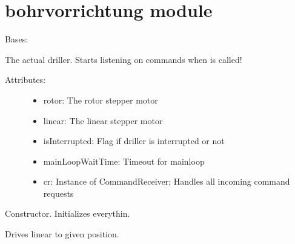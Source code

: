 \documentclass[letterpaper,10pt,english]{sphinxmanual}
\begin{document}
\section{bohrvorrichtung module}
\label{bohrvorrichtung::doc}\label{bohrvorrichtung:bohrvorrichtung-module}\label{bohrvorrichtung:module-bohrvorrichtung}

\begin{fulllineitems}
\label{bohrvorrichtung:bohrvorrichtung.Bohrvorrichtung}
Bases: 

The actual driller. Starts listening on commands when {\hyperref[bohrvorrichtung:bohrvorrichtung.Bohrvorrichtung.start]{}} is called!
\begin{description}
\item[{Attributes:}] \leavevmode\begin{itemize}
\item {} 
rotor: The rotor stepper motor

\item {} 
linear: The linear stepper motor

\item {} 
isInterrupted: Flag if driller is interrupted or not

\item {} 
mainLoopWaitTime: Timeout for mainloop

\item {} 
cr: Instance of CommandReceiver; Handles all incoming command requests

\end{itemize}

\end{description}

\begin{fulllineitems}
\label{bohrvorrichtung:bohrvorrichtung.Bohrvorrichtung.__init__}
Constructor. Initializes everythin.

\end{fulllineitems}


\begin{fulllineitems}
\label{bohrvorrichtung:bohrvorrichtung.Bohrvorrichtung.driveLinearTo}
Drives linear to given position.


\end{fulllineitems}
\end{fulllineitems}
\end{document}
